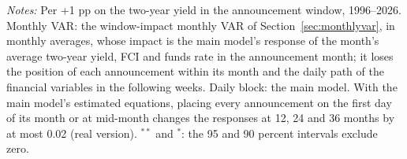 \begin{table}[tp]\centering\small
\caption{The Daily Block and Financial Conditions (24 Months; 12 Lags)}\label{tab:timing2}
\begin{flushleft}\footnotesize\textit{Notes:} Per +1 pp on the two-year yield in the announcement window, 1996--2026. Monthly VAR: the window-impact monthly VAR of Section~\ref{sec:monthlyvar}, in monthly averages, whose impact is the main model's response of the month's average two-year yield, FCI and funds rate in the announcement month; it loses the position of each announcement within its month and the daily path of the financial variables in the following weeks. Daily block: the main model. With the main model's estimated equations, placing every announcement on the first day of its month or at mid-month changes the responses at 12, 24 and 36 months by at most 0.02 (real version). $^{**}$ and $^{*}$: the 95 and 90 percent intervals exclude zero.\end{flushleft}
\end{table}
